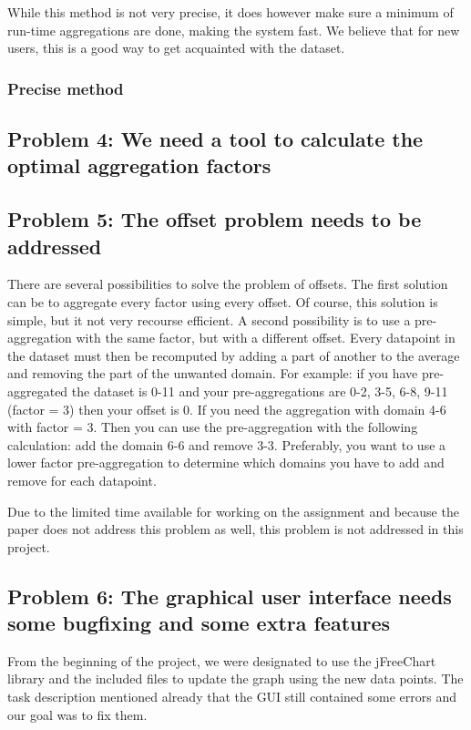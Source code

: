 
While this method is not very precise, it does however make sure a minimum of run-time aggregations are done, making the system fast. We believe that for new users, this is a good way to get acquainted with the dataset.

\subsubsection{Precise method}

\subsection{Problem 4: We need a tool to calculate the optimal aggregation factors}
\subsection{Problem 5: The offset problem needs to be addressed}
There are several possibilities to solve the problem of offsets. The first solution can be to aggregate every factor using every offset. Of course, this solution is simple, but it not very recourse efficient. A second possibility is to use a pre-aggregation with the same factor, but with a different offset. Every datapoint in the dataset must then be recomputed by adding a part of another to the average and removing the part of the unwanted domain. For example: if you have pre-aggregated the dataset is 0-11 and your pre-aggregations are 0-2, 3-5, 6-8, 9-11 (factor = 3) then your offset is 0. If you need the aggregation with domain 4-6 with factor = 3. Then you can use the pre-aggregation with the following calculation: add the domain 6-6 and remove 3-3. Preferably, you want to use a lower factor pre-aggregation to determine which domains you have to add and remove for each datapoint.

Due to the limited time available for working on the assignment and because the paper\cite{wombacher2011} does not address this problem as well, this problem is not addressed in this project.

\subsection{Problem 6: The graphical user interface needs some bugfixing and some extra features}
From the beginning of the project, we were designated to use the jFreeChart library and the included files to update the graph using the new data points. The task description mentioned already that the GUI still contained some errors and our goal was to fix them.

